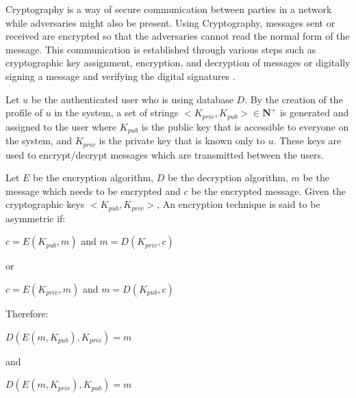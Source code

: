 		\begin{defn}[Cryptography]
			Cryptography is a way of secure communication between parties in a network while adversaries might also be present. Using Cryptography, messages sent or received are encrypted so that the adversaries cannot read the normal form of the message. This communication is established through various steps such as cryptographic key assignment, encryption, and decryption of messages or digitally signing a message and verifying the digital signatures \cite{stallings2017cryptography}.
		\label{dfn:cryptography}
		\end{defn}
		\begin{defn}
			Let $u$ be the authenticated user who is using database $D$. By the creation of the profile of $u$ in the system, a set of strings $<K_{priv}, K_{pub}> \in \mathbf{N}^+$ is generated and assigned to the user where $K_{pub}$ is the public key that is accessible to everyone on the system, and $K_{priv}$ is the private key that is known only to $u$. These keys are used to encrypt/decrypt messages which are transmitted between the users\cite{stallings2017cryptography}.
		\label{dfn:cryptographic_keys}
		\end{defn}
		\begin{defn}
			Let $E$ be the encryption algorithm, $D$ be the decryption algorithm, $m$ be the message which needs to be encrypted and $c$ be the encrypted message. Given the cryptographic keys $<K_{pub}, K_{priv}>$, An encryption technique is said to be asymmetric if:
			\begin{center}
				$c = E(K_{pub},m)$ and  $m = D(K_{priv},c)$
			\end{center}
			or
			\begin{center}
				$c = E(K_{priv},m)$ and  $m = D(K_{pub},c)$
			\end{center}
			Therefore:
			\begin{center}
				$D(E(m,K_{pub}),K_{priv}) = m$ 
			\end{center}
			and
			\begin{center}
				$D(E(m,K_{priv}),K_{pub}) = m$
			\end{center}
		\label{dfn:assymetric_encryption}
		\end{defn}

